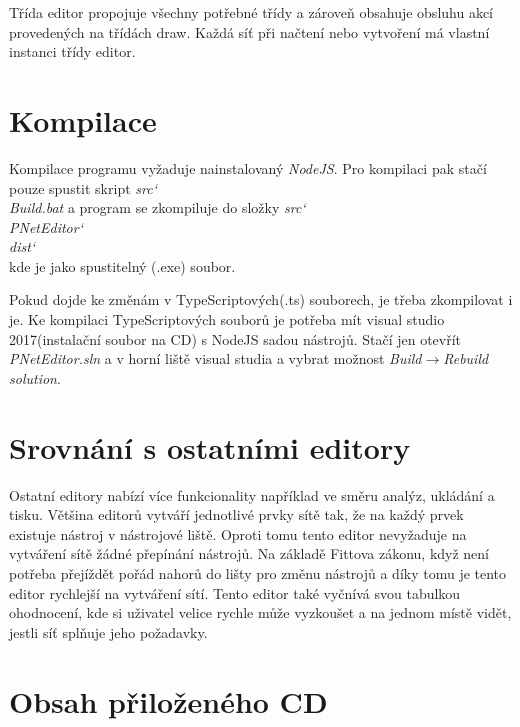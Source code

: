 \documentclass[
  biblatex,
  glossaries,
  printversion
]{kidiplom}
\begin{document}
Třída editor propojuje všechny potřebné třídy a zároveň obsahuje obsluhu 
akcí provedených na třídách draw. Každá síť při načtení nebo vytvoření 
má vlastní instanci třídy editor.




\section{Kompilace}

Kompilace programu vyžaduje nainstalovaný \textit{NodeJS}. Pro kompilaci pak
stačí pouze spustit skript \textit{src\char`\\Build.bat} a program se zkompiluje do složky 
\textit{src\char`\\PNetEditor\char`\\dist\char`\\} kde je jako spustitelný (.exe) soubor.

Pokud dojde ke změnám v TypeScriptových(.ts) souborech, je třeba zkompilovat i je.
Ke kompilaci TypeScriptových souborů je potřeba mít visual studio 2017(instalační soubor na CD)
s NodeJS sadou nástrojů. Stačí jen otevřít \\
\textit{PNetEditor.sln} a v horní liště 
visual studia a vybrat možnost \textit{Build$\to$Rebuild solution}.




\section{Srovnání s ostatními editory}

Ostatní editory nabízí více funkcionality například ve směru analýz, 
ukládání a tisku. Většina editorů vytváří jednotlivé prvky sítě tak,
že na každý prvek existuje nástroj v nástrojové liště. Oproti tomu 
tento editor nevyžaduje na vytváření sítě žádné přepínání nástrojů.
Na základě Fittova zákonu, když není potřeba přejíždět pořád nahorů do lišty 
pro změnu nástrojů a díky tomu je tento editor rychlejší na vytváření sítí.
Tento editor také vyčnívá svou tabulkou ohodnocení, kde si uživatel velice 
rychle může vyzkoušet a na jednom místě vidět, jestli síť splňuje jeho požadavky.




\section{Obsah přiloženého CD} \label{sec:ObsahCD}
\end{document}
